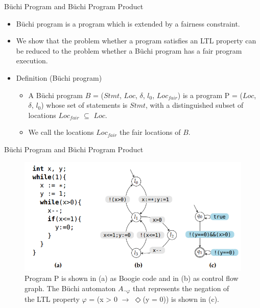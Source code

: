 \documentclass[12pt]{beamer}
\begin{document}
\begin{frame}{B\"uchi Program and B\"uchi Program Product}
  	\begin{itemize}
		\item B\"uchi program is a program which is extended by a fairness constraint.
		\item We show that the problem whether a program satisfies an LTL property can be reduced to the problem whether a B\"uchi program has a fair program execution.
		\item Definition (B\"uchi program)
		\begin{itemize}
			\item A B\"uchi program $B$ = ($Stmt$, $Loc$, $\delta$, $l_{0}$, $Loc_{fair}$) is a program P = ($Loc$, $\delta$, $l_{0}$) whose set of statements is $Stmt$, with a distinguished subset of locations $Loc_{fair}$ $\subseteq$ $Loc$.
			\item We call the locations $Loc_{fair}$ the fair locations of $B$.
		\end{itemize}
  	\end{itemize}
\end{frame}

\captionsetup[figure]{font=scriptsize ,labelfont=scriptsize}
\begin{frame}{B\"uchi Program and B\"uchi Program Product}
    \begin{figure}
        \centering
        \includegraphics[scale=0.35]{program_and_spec.png}
        \caption{Program P is shown in (a) as Boogie code and in (b) as control flow graph. The B\"uchi automaton $A_{\neg\varphi}$ that represents the negation of the LTL property $\varphi$ = (x > 0 $\rightarrow$ $\Diamond$(y = 0)) is shown in (c).}
    \end{figure}    
\end{frame}
\end{document}
